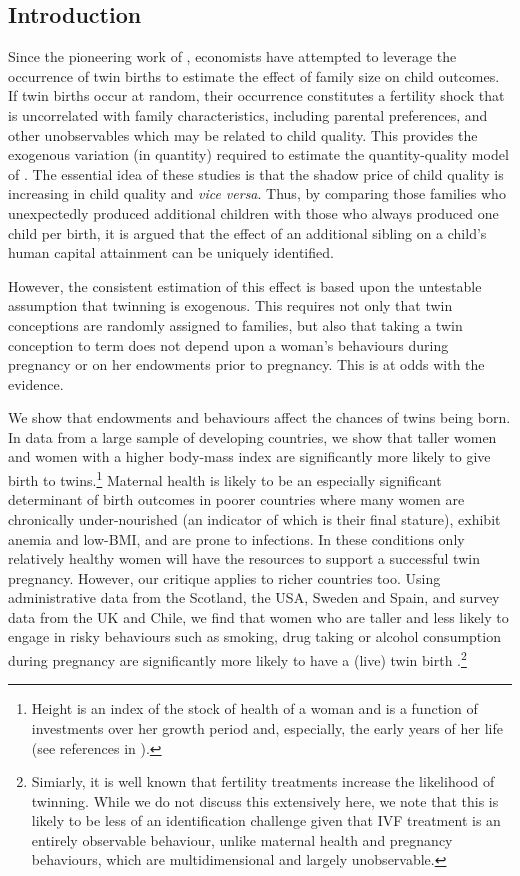 \documentclass[subeqn]{article}
\begin{document}
\begin{spacing}{1.4}
\section{Introduction}                             \label{TWINscn:intro}
Since the pioneering work of \citet{RosenzweigWolpin1980}, economists have 
attempted to leverage the occurrence of twin births to estimate the effect of 
family size on child outcomes. If twin births occur at random, their occurrence 
constitutes a fertility shock that is uncorrelated with family characteristics, 
including parental preferences, and other unobservables which may be related to 
child quality. This provides the exogenous variation (in quantity) required to 
estimate the quantity-quality model of \citet{Becker1960,BeckerLewis1973,
BeckerTomes1976}.  The essential idea of these studies is that the shadow price 
of child quality is increasing in child quality and \emph{vice versa}. Thus, by 
comparing those families who unexpectedly produced additional children with 
those who always produced one child per birth, it is argued that the effect of 
an additional sibling on a child's human capital attainment can be uniquely
identified.

However, the consistent estimation of this effect is based upon the untestable 
assumption that twinning is exogenous. This requires not only that twin 
conceptions are randomly assigned to families, but also that taking a twin
conception to term does not depend upon a woman's behaviours during pregnancy 
or on her endowments prior to pregnancy. This is at odds with the evidence.

We show that endowments and behaviours affect the chances of twins being born. 
In data from a large sample of developing countries, we show that taller women 
and women with a higher body-mass index are significantly more likely to give 
birth to twins.\footnote{Height is an index of the stock of health of a woman 
and is a function of investments over her growth period and, especially, the 
early years of her life (see references in \citet{BhalotraRawlings2013}).} 
Maternal health is likely to be an especially significant determinant of birth 
outcomes in poorer countries where many women are chronically under-nourished 
(an indicator of which is their final stature), exhibit anemia and low-BMI, and 
are prone to infections. In these conditions only relatively healthy women will 
have the resources to support a successful twin pregnancy. However, our critique 
applies to richer countries too. Using administrative data from the Scotland,
the USA, Sweden and Spain, and survey data from the UK and Chile, we find that 
women who are taller and less likely to engage in risky behaviours such as 
smoking, drug taking or alcohol consumption during pregnancy are significantly 
more likely to have a (live) twin birth \citep{BhalotraClarke2016}.\footnote{%
  Simiarly, it is well known 
that fertility treatments increase the likelihood of twinning. While we do not 
discuss this extensively here, we note that this is likely to be less of an 
identification challenge given that IVF treatment is an entirely observable 
behaviour, unlike maternal health and pregnancy behaviours, which are 
multidimensional and largely unobservable.}


\end{spacing}
\end{document}
